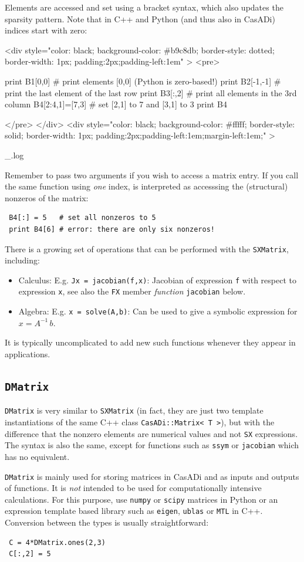 \documentclass[a4paper,12pt]{book}
\newcounter{pytexcount}
\newcounter{pytexsubcount}
\renewenvironment{pytex}
{\addtocounter{pytexsubcount}{1}%
\begin{rawhtml}
<div style="color: black; background-color: \#b9c8db;  border-style: dotted; border-width: 1px; padding:2px;padding-left:1em" >
<pre>
\end{rawhtml}
}%
{\begin{rawhtml}
</pre>
</div>
<div style="color: black; background-color: \#fffff;  border-style: solid; border-width: 1px; padding:2px;padding-left:1em;margin-left:1em;" >\end{rawhtml}
_\arabic{pytexsubcount}.log}%
\begin{rawhtml}
</div>
\end{rawhtml}
}
\begin{document}
{Elements are accessed and set using a bracket syntax, which also updates the sparsity pattern. Note that in C++ and Python (and thus also in CasADi) indices start with zero:
\begin{pytex} 
print B1[0,0]   # print elements [0,0] (Python is zero-based!)
print B2[-1,-1] # print the last element of the last row
print B3[:,2]   # print all elements in the 3rd column
B4[2:4,1]=[7,3] # set [2,1] to 7 and [3,1] to 3
print B4
\end{pytex}

Remember to pass two arguments if you wish to access a matrix entry. If you call the same function using \emph{one} index, is interpreted as accesssing the (structural) nonzeros of the matrix:
\begin{verbatim}
 B4[:] = 5   # set all nonzeros to 5
 print B4[6] # error: there are only six nonzeros!
\end{verbatim}

There is a growing set of operations that can be performed with the \texttt{SXMatrix}, including:
\begin{itemize}
 \item Calculus: E.g. \verb|Jx = jacobian(f,x)|: Jacobian of expression \texttt{f} with respect to expression \texttt{x}, see also the \texttt{FX} member \emph{function} \texttt{jacobian} below.
 \item Algebra: E.g. \verb|x = solve(A,b)|: Can be used to give a symbolic expression for $x = A^{-1} \, b$.
\end{itemize}
It is typically uncomplicated to add new such functions whenever they appear in applications.

\subsection{\texttt{DMatrix}}
\texttt{DMatrix} is very similar to \texttt{SXMatrix} (in fact, they are just two template instantiations of the same C++ class \texttt{CasADi::Matrix<\,T\,>}), but with the difference that the nonzero elements are numerical values and not \texttt{SX} expressions. The syntax is also the same, except for functions such as \texttt{ssym} or \texttt{jacobian} which has no equivalent.

\texttt{DMatrix} is mainly used for storing matrices in CasADi and as inputs and outputs of functions. It is \emph{not} intended to be used for computationally intensive calculations. For this purpose, use \texttt{numpy} or \texttt{scipy} matrices in Python or an expression template based library such as \texttt{eigen}, \texttt{ublas} or \texttt{MTL} in C++. Conversion between the types is usually straightforward:
\begin{verbatim}
 C = 4*DMatrix.ones(2,3)
 C[:,2] = 5


\end{verbatim}}
\end{document}
